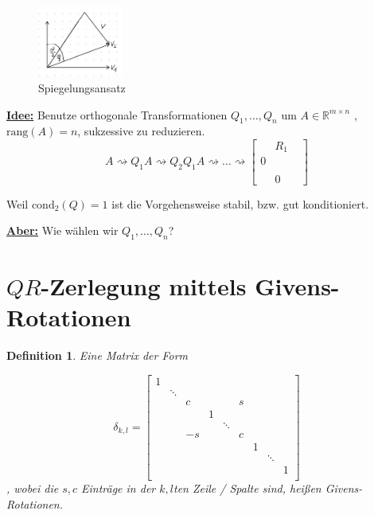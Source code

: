 \documentclass{book}
\newtheorem{definition}[algorithm]{Definition}
\def\R{\mathbb{R}}
\def\rang{\text{rang}}
\def\cond{\text{cond}}
\begin{document}
            \begin{figure}[H]
                \centering
                \includegraphics[width=0.25\textwidth]{Bild007}
                \caption{Spiegelungsansatz}
            \end{figure}


            \underline{\textbf{Idee:}} Benutze orthogonale Transformationen $Q_1,\dots,Q_n$ um $A\in\R^{m\times n}$ 
            ,$\rang(A)=n$, sukzessive zu reduzieren.
            \[A\rightsquigarrow Q_1A\rightsquigarrow Q_2Q_1 A\rightsquigarrow\dots\rightsquigarrow \begin{bmatrix}
                &R_1\\
                0 &\\
                \\
                & 0 &
            \end{bmatrix}\]

            Weil $\cond_2(Q)=1$ ist die Vorgehensweise stabil, bzw. gut konditioniert.

            \underline{\textbf{Aber:}} Wie wählen wir $Q_1,\dots,Q_n$?

        \section{$QR$-Zerlegung mittels Givens-Rotationen}

            \begin{definition}\label{d2.12}
                Eine Matrix der Form
                
                \[
                    \delta_{k,l}=\begin{bmatrix}
                        1 & & & & & & & & \\
                        & \ddots & & & & & & & \\
                        & & c & &  & s & & & \\
                        & & & 1 &  & & & & \\
                        & & & &  \ddots  & & & & \\
                        & & -s & & & c & & & \\
                        & &  & & & & 1 & & \\
                        & &  & & & & & \ddots & \\
                        & &  & & & & &  & 1\\
                    \end{bmatrix}
                \]
                , wobei die $s,c$ Einträge in der $k,l$ten Zeile / Spalte sind, heißen Givens-Rotationen.
            \end{definition}
\end{document}

